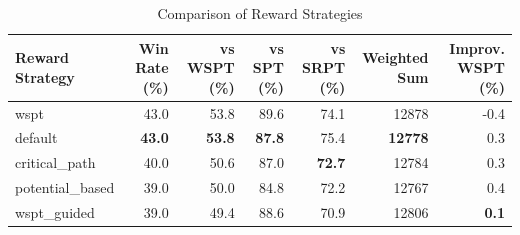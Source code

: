 \begin{table}[htbp]%
\centering%
\begin{tabular}{lrrrrrr}%
\toprule%
\textbf{Reward Strategy}&\textbf{Win Rate (\%)}&\textbf{vs WSPT (\%)}&\textbf{vs SPT (\%)}&\textbf{vs SRPT (\%)}&\textbf{Weighted Sum}&\textbf{Improv. WSPT (\%)}\\%
\midrule%
wspt&43.0&53.8&89.6&74.1&12878&-0.4\\%
default&\textbf{43.0}&\textbf{53.8}&\textbf{87.8}&75.4&\textbf{12778}&0.3\\%
critical_path&40.0&50.6&87.0&\textbf{72.7}&12784&0.3\\%
potential_based&39.0&50.0&84.8&72.2&12767&0.4\\%
wspt_guided&39.0&49.4&88.6&70.9&12806&\textbf{0.1}\\%
\bottomrule%
\end{tabular}%
\caption{Comparison of Reward Strategies}%
\label{tab:rewards}%
\end{table}